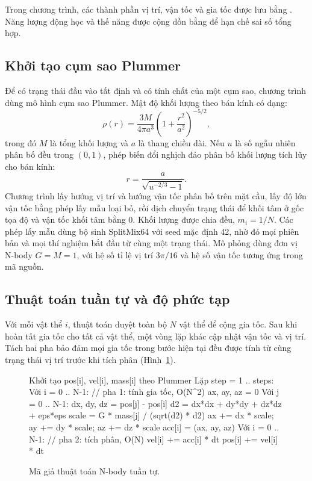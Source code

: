 Trong chương trình, các thành phần vị trí, vận tốc và gia tốc được lưu bằng . Năng lượng động học và thế năng được cộng dồn bằng  để hạn chế sai số tổng hợp.

\subsection{Khởi tạo cụm sao Plummer}

Để có trạng thái đầu vào tất định và có tính chất của một cụm sao, chương trình dùng mô hình cụm sao Plummer. Mật độ khối lượng theo bán kính có dạng:
\begin{equation}
\rho(r)=\frac{3M}{4\pi a^3} \left(1+\frac{r^2}{a^2}\right)^{-5/2},
\end{equation}
trong đó $M$ là tổng khối lượng và $a$ là thang chiều dài. Nếu $u$ là số ngẫu nhiên phân bố đều trong $(0,1)$, phép biến đổi nghịch đảo phân bố khối lượng tích lũy cho bán kính:
\begin{equation}
r=\frac{a}{\sqrt{u^{-2/3}-1}}.
\end{equation}
Chương trình lấy hướng vị trí và hướng vận tốc phân bố trên mặt cầu, lấy độ lớn vận tốc bằng phép lấy mẫu loại bỏ, rồi dịch chuyển trạng thái để khối tâm ở gốc tọa độ và vận tốc khối tâm bằng 0. Khối lượng được chia đều, $m_i=1/N$. Các phép lấy mẫu dùng bộ sinh SplitMix64 với seed mặc định 42, nhờ đó mọi phiên bản và mọi thí nghiệm bắt đầu từ cùng một trạng thái. Mô phỏng dùng đơn vị N-body $G=M=1$, với hệ số tỉ lệ vị trí $3\pi/16$ và hệ số vận tốc tương ứng trong mã nguồn.

\subsection{Thuật toán tuần tự và độ phức tạp}
\label{sec:tuan-tu}

Với mỗi vật thể $i$, thuật toán duyệt toàn bộ $N$ vật thể để cộng gia tốc. Sau khi hoàn tất gia tốc cho tất cả vật thể, một vòng lặp khác cập nhật vận tốc và vị trí. Tách hai pha bảo đảm mọi gia tốc trong bước hiện tại đều được tính từ cùng trạng thái vị trí trước khi tích phân (Hình~\ref{fig:tuan-tu}).

\begin{figure}[H]
\begin{MaGia}
Khởi tạo pos[i], vel[i], mass[i] theo Plummer
Lặp step = 1 .. steps:
    Với i = 0 .. N-1:                       // pha 1: tính gia tốc, O(N^2)
        ax, ay, az = 0
        Với j = 0 .. N-1:
            dx, dy, dz = pos[j] - pos[i]
            d2 = dx*dx + dy*dy + dz*dz + eps*eps
            scale = G * mass[j] / (sqrt(d2) * d2)
            ax += dx * scale;  ay += dy * scale;  az += dz * scale
        acc[i] = (ax, ay, az)
    Với i = 0 .. N-1:                       // pha 2: tích phân, O(N)
        vel[i] += acc[i] * dt
        pos[i] += vel[i] * dt
\end{MaGia}
\caption{Mã giả thuật toán N-body tuần tự.}
\label{fig:tuan-tu}
\end{figure}

